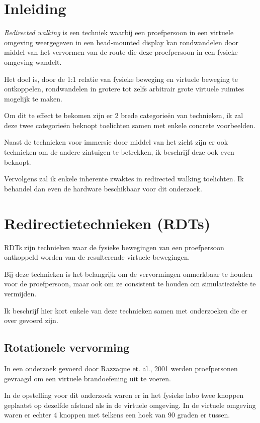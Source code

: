 \section{Inleiding}
\emph{Redirected walking} is een techniek waarbij een proefpersoon in een 
virtuele omgeving weergegeven in een head-mounted display kan rondwandelen door 
middel van het vervormen van de route die deze proefpersoon in een fysieke 
omgeving wandelt.

Het doel is, door de 1:1 relatie van fysieke beweging en virtuele beweging te
ontkoppelen, rondwandelen in grotere tot zelfs arbitrair grote virtuele ruimtes
mogelijk te maken.

Om dit te effect te bekomen zijn er 2 brede categorie\"en van technieken, ik zal
deze twee categorie\"en beknopt toelichten samen met enkele concrete voorbeelden.

Naast de technieken voor immersie door middel van het zicht zijn er ook 
technieken om de andere zintuigen te betrekken, ik beschrijf deze ook even 
beknopt.

Vervolgens zal ik enkele inherente zwaktes in redirected walking toelichten. Ik 
behandel dan even de hardware beschikbaar voor dit onderzoek.

\section{Redirectietechnieken (RDTs)}
RDTs zijn technieken waar de fysieke bewegingen van een proefpersoon ontkoppeld
worden van de resulterende virtuele bewegingen.

Bij deze technieken is het belangrijk om de vervormingen onmerkbaar te houden
voor de proefpersoon\cite{kohn01}, maar ook om ze consistent te houden om 
simulatieziekte te vermijden\cite{kolasinski95}.

Ik beschrijf hier kort enkele van deze technieken samen met onderzoeken die er 
over gevoerd zijn.


\subsection{Rotationele vervorming}
In een onderzoek gevoerd door Razzaque et. al., 2001 \cite{kohn01} werden 
proefpersonen gevraagd om een virtuele brandoefening uit te voeren.

In de opstelling voor dit onderzoek waren er in het fysieke labo twee knoppen
geplaatst op dezelfde afstand als in de virtuele omgeving. In de virtuele
omgeving waren er echter 4 knoppen met telkens een hoek van 90 graden er tussen.

